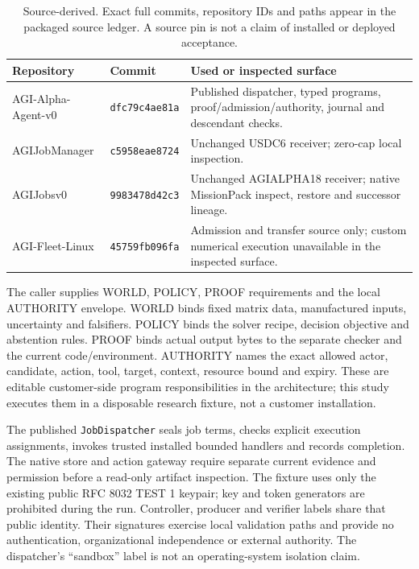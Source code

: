 \documentclass[11pt,a4paper]{article}
\newcommand{\source}{\textsf{Source-derived}}
\begin{document}
\begin{table}[ht]\centering\small
\begin{tabularx}{\linewidth}{@{}L{28mm}L{23mm}Y@{}}\toprule
Repository & Commit & Used or inspected surface \\\midrule
AGI-Alpha-Agent-v0 & \texttt{dfc79c4ae81a} & Published dispatcher, typed programs, proof/admission/authority, journal and descendant checks. \\
AGIJobManager & \texttt{c5958eae8724} & Unchanged USDC6 receiver; zero-cap local inspection. \\
AGIJobsv0 & \texttt{9983478d42c3} & Unchanged AGIALPHA18 receiver; native MissionPack inspect, restore and successor lineage. \\
AGI-Fleet-Linux & \texttt{45759fb096fa} & Admission and transfer source only; custom numerical execution unavailable in the inspected surface. \\\bottomrule
\end{tabularx}
\caption{\source{}. Exact full commits, repository IDs and paths appear in the packaged source ledger. A source pin is not a claim of installed or deployed acceptance.}
\label{tab:repos}\end{table}

The caller supplies WORLD, POLICY, PROOF requirements and the local AUTHORITY envelope. WORLD binds fixed matrix data, manufactured inputs, uncertainty and falsifiers. POLICY binds the solver recipe, decision objective and abstention rules. PROOF binds actual output bytes to the separate checker and the current code/environment. AUTHORITY names the exact allowed actor, candidate, action, tool, target, context, resource bound and expiry. These are editable customer-side program responsibilities in the architecture; this study executes them in a disposable research fixture, not a customer installation.

The published \texttt{JobDispatcher} seals job terms, checks explicit execution assignments, invokes trusted installed bounded handlers and records completion. The native store and action gateway require separate current evidence and permission before a read-only artifact inspection. The fixture uses only the existing public RFC 8032 TEST 1 keypair; key and token generators are prohibited during the run. \citep{rfc8032} Controller, producer and verifier labels share that public identity. Their signatures exercise local validation paths and provide no authentication, organizational independence or external authority. The dispatcher's ``sandbox'' label is not an operating-system isolation claim.
\end{document}
